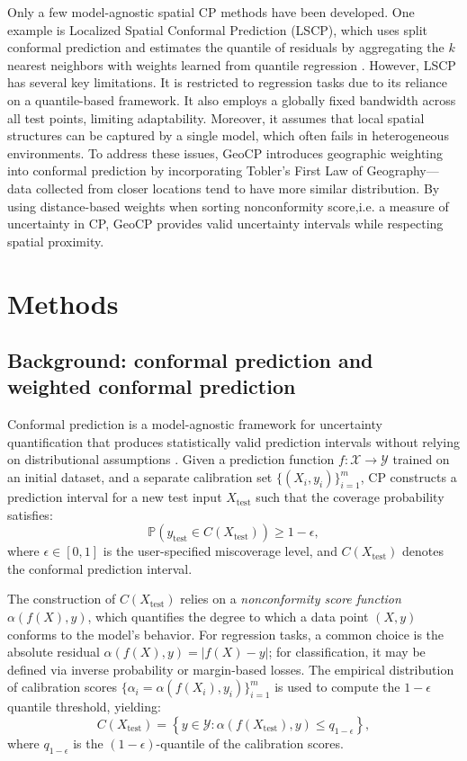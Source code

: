 \documentclass[authoryear,preprint,review,12pt]{elsarticle}
\begin{document}
Only a few model-agnostic spatial CP methods have been developed. One example is Localized Spatial Conformal Prediction (LSCP), which uses split conformal prediction and estimates the quantile of residuals by aggregating the $k$ nearest neighbors with weights learned from quantile regression \citep{jiang2024spatial}. However, LSCP has several key limitations. It is restricted to regression tasks due to its reliance on a quantile-based framework. It also employs a globally fixed bandwidth across all test points, limiting adaptability. Moreover, it assumes that local spatial structures can be captured by a single model, which often fails in heterogeneous environments. To address these issues, GeoCP introduces geographic weighting into conformal prediction by incorporating Tobler’s First Law of Geography—data collected from closer locations tend to have more similar distribution\citep{lou2025geoconformal}. By using distance-based weights when sorting nonconformity score,i.e. a measure of uncertainty in CP, GeoCP provides valid uncertainty intervals while respecting spatial proximity. 
\section{Methods}

\subsection{Background: conformal prediction and weighted conformal prediction}

Conformal prediction is a model-agnostic framework for uncertainty quantification that produces statistically valid prediction intervals without relying on distributional assumptions \citep{angelopoulos2023conformal}. Given a prediction function $f: \mathcal{X} \to \mathcal{Y}$ trained on an initial dataset, and a separate calibration set $\{(X_i, y_i)\}_{i=1}^m$, CP constructs a prediction interval for a new test input $X_{\text{test}}$ such that the coverage probability satisfies:
\begin{equation}
    \mathbb{P}\left(y_{\text{test}} \in C(X_{\text{test}})\right) \geq 1 - \epsilon,
\end{equation}
where $\epsilon \in [0, 1]$ is the user-specified miscoverage level, and $C(X_{\text{test}})$ denotes the conformal prediction interval.

The construction of $C(X_{\text{test}})$ relies on a \emph{nonconformity score function} $\alpha(f(X), y)$, which quantifies the degree to which a data point $(X, y)$ conforms to the model's behavior. For regression tasks, a common choice is the absolute residual $\alpha(f(X), y) = |f(X) - y|$; for classification, it may be defined via inverse probability or margin-based losses. The empirical distribution of calibration scores $\{\alpha_i = \alpha(f(X_i), y_i)\}_{i=1}^m$ is used to compute the $1 - \epsilon$ quantile threshold, yielding:
\begin{equation}
    C(X_{\text{test}}) = \left\{ y \in \mathcal{Y} : \alpha(f(X_{\text{test}}), y) \leq q_{1 - \epsilon} \right\},
\end{equation}
where $q_{1 - \epsilon}$ is the $(1 - \epsilon)$-quantile of the calibration scores.
\end{document}
